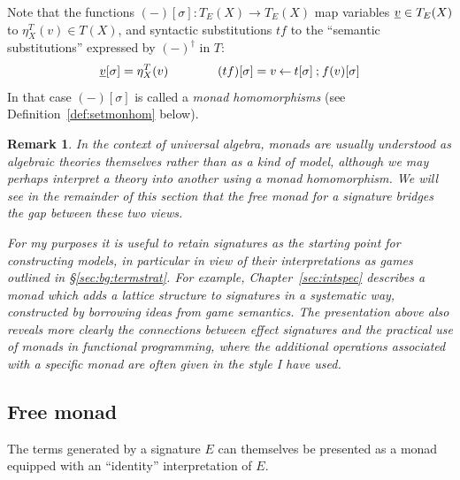 \documentclass[11pt,oneside]{book}
\newtheorem{remark}[theorem]{Remark}
\theoremstyle{definition}
\newcommand{\ul}[1]{%
  \underline{\smash{#1}}
}
\begin{document}
Note that the functions
$(-)[\sigma] : T_E(X) \rightarrow T_E(X)$
map variables $\ul{v} \in T_E(X)$ to $\eta^T_X(v) \in T(X)$,
and syntactic substitutions $t f$
to the ``semantic substitutions'' expressed by $(-)^\dagger$ in $T$:
\begin{equation} \label{eqn:substint}
  \ul{v}[\sigma] = \eta^T_X(v)
  \qquad \qquad
  (t f)[\sigma] = v \mathbin\leftarrow t[\sigma] \mathbin; f(v)[\sigma]
\end{equation}
In that case $(-)[\sigma]$ is called a
\emph{monad homomorphisms} (see Definition~\ref{def:setmonhom} below).

\begin{remark} %
In the context of universal algebra,
monads are usually understood
as algebraic theories themselves
rather than as a kind of model,
although we may perhaps interpret a theory
into another using a monad homomorphism.
We will see in the remainder of this section that
the \emph{free monad} for a signature
bridges the gap between these two views.

For my purposes it is useful to retain signatures
as the starting point for constructing models,
in particular in view of their interpretations as games
outlined in \S\ref{sec:bg:termstrat}.
For example,
Chapter~\ref{sec:intspec}
describes a monad which adds
a lattice structure to signatures in a systematic way,
constructed by borrowing ideas from game semantics.
The presentation above also
reveals more clearly the connections between effect signatures
and the practical use of monads in functional programming,
where the additional operations associated with a specific monad
are often given in the style I have used.
\end{remark}


\subsection{Free monad} \label{sec:eff:freemon} %

The terms generated by a signature $E$
can themselves be presented as a monad
equipped with an ``identity'' interpretation of $E$.
\end{document}
